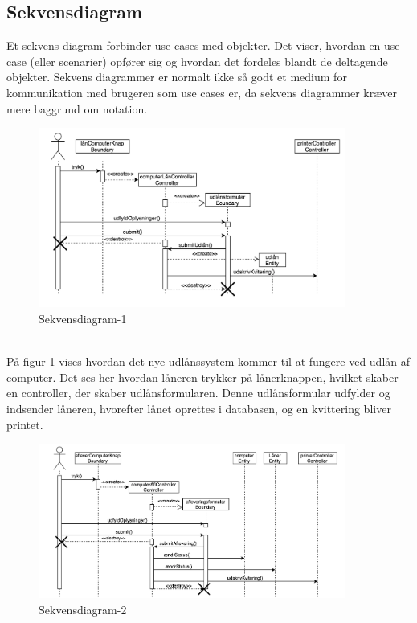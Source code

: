 \documentclass[a4paper]{article}
\begin{document}
\subsection{Sekvensdiagram}
Et sekvens diagram forbinder use cases med objekter. Det viser, hvordan en use case (eller scenarier) opfører sig og hvordan det fordeles blandt de deltagende objekter. Sekvens diagrammer er normalt ikke så godt et medium for kommunikation med brugeren som use cases er, da sekvens diagrammer kræver mere baggrund om notation. \cite[p~179]{OOSE} 
\begin{figure}[h!]
\includegraphics[width=0.9\textwidth]{SekvensLaan}
  \caption{Sekvensdiagram-1}
    \label{fig:SEK1}
  \centering
\end{figure}\\
På figur \ref{fig:SEK1} vises hvordan det nye udlånssystem kommer til at fungere ved udlån af computer. Det ses her hvordan låneren trykker på lånerknappen, hvilket skaber en controller, der skaber udlånsformularen. Denne udlånsformular udfylder og indsender låneren, hvorefter lånet oprettes i databasen, og en kvittering bliver printet.
\newpage
\begin{figure}[h!]
\includegraphics[width=0.9\textwidth]{SekvensAflever}
  \caption{Sekvensdiagram-2}
    \label{fig:SEK2}
  \centering
\end{figure}
\end{document}
